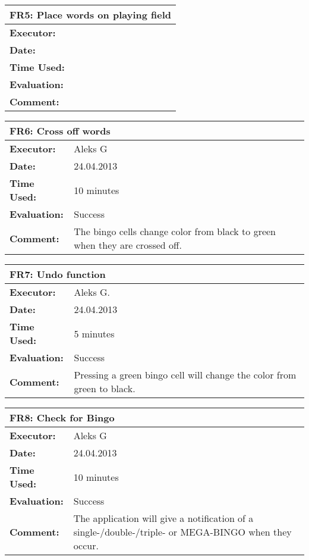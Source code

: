 \begin{tabular}{|m{}||m{}|}
\hline
\multicolumn{2}{|l|}{FR5: Place words on playing field} \\ \hline
\textbf{Executor:} & \\ \hline
\textbf{Date:} & \\ \hline
\textbf{Time Used:} & \\ \hline
\textbf{Evaluation:} & \\ \hline
\textbf{Comment:} & \\ \hline
\end{tabular}

\begin{tabular}{|m{}||m{}|}
\hline
\multicolumn{2}{|l|}{FR6: Cross off words} \\ \hline
\textbf{Executor:} & Aleks G\\ \hline
\textbf{Date:} & 24.04.2013\\ \hline
\textbf{Time Used:} & 10 minutes\\ \hline
\textbf{Evaluation:} & Success\\ \hline
\textbf{Comment:} & The bingo cells change color from black to green when they are crossed off. \\ \hline
\end{tabular}

\begin{tabular}{|m{}||m{}|}
\hline
\multicolumn{2}{|l|}{FR7: Undo function} \\ \hline
\textbf{Executor:} & Aleks G.\\ \hline
\textbf{Date:} & 24.04.2013\\ \hline
\textbf{Time Used:} & 5 minutes \\ \hline
\textbf{Evaluation:} & Success\\ \hline
\textbf{Comment:} & Pressing a green bingo cell will change the color from green to black.\\ \hline
\end{tabular}

\begin{tabular}{|m{}||m{}|}
\hline
\multicolumn{2}{|l|}{FR8: Check for Bingo} \\ \hline
\textbf{Executor:} & Aleks G \\ \hline
\textbf{Date:} & 24.04.2013\\ \hline
\textbf{Time Used:} & 10 minutes \\ \hline
\textbf{Evaluation:} & Success\\ \hline
\textbf{Comment:} & The application will give a notification of a single-/double-/triple- or MEGA-BINGO when they occur.\\ \hline
\end{tabular}

